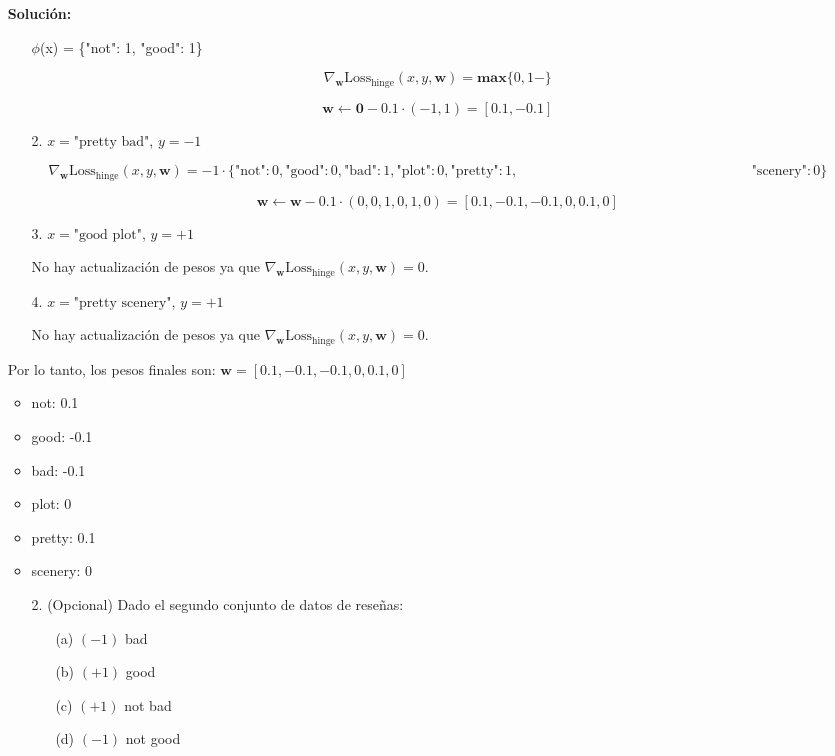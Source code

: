 \documentclass[11pt,letterpaper]{article}
\newenvironment{solution}{%
  \noindent\begin{shaded}
  \textbf{Solución:}\ }{
  \end{shaded}%
}
\begin{document}
\begin{enumerate}
\begin{solution}
\begin{enumerate}
    $\phi$(x) = \{"not": 1, "good": 1\}

\[
\nabla_{\mathbf{w}} \text{Loss}_{\text{hinge}}(x, y, \mathbf{w}) = \mathbf{max} \{0, 1 - \}
\]

\[
\mathbf{w} \leftarrow \mathbf{0} - 0.1 \cdot (-1, 1) = [0.1, -0.1]
\]

    \item[2.]  \(x = \text{"pretty bad"}\), \(y = -1\)

\[
\nabla_{\mathbf{w}} \text{Loss}_{\text{hinge}}(x, y, \mathbf{w}) = -1 \cdot \{ \text{"not"} : 0, \text{"good"} : 0, \text{"bad"} : 1, \text{"plot"} : 0, \text{"pretty"} : 1, 

\hspace{7cm} \text{"scenery"} : 0 \}
\]

\[
\mathbf{w} \leftarrow \mathbf{w} - 0.1 \cdot (0, 0, 1, 0, 1, 0) = [0.1, -0.1, -0.1, 0, 0.1, 0]
\]

    \item[3.]  \(x = \text{"good plot"}\), \(y = +1\)

No hay actualización de pesos ya que \(\nabla_{\mathbf{w}} \text{Loss}_{\text{hinge}}(x, y, \mathbf{w}) = 0\).

    \item[4.]  \(x = \text{"pretty scenery"}\), \(y = +1\)

No hay actualización de pesos ya que \(\nabla_{\mathbf{w}} \text{Loss}_{\text{hinge}}(x, y, \mathbf{w}) = 0\).
\end{enumerate}

Por lo tanto, los pesos finales son:
\(\mathbf{w} = [0.1, -0.1, -0.1, 0, 0.1, 0]\)
\begin{itemize}
\item not: 0.1
    \item good: -0.1
    \item bad: -0.1
    \item plot: 0
    \item pretty: 0.1
    \item scenery: 0
\end{itemize}

  \end{solution}
\begin{itemize}
    \item[2.] (Opcional) Dado el segundo conjunto de datos de reseñas:
\begin{enumerate}
    \item[(a)] $(-1)$ bad
    \item[(b)] $(+1)$ good
    \item[(c)] $(+1)$ not bad
    \item[(d)] $(-1)$ not good
\end{enumerate}


\end{itemize}
\end{enumerate}
\end{document}
